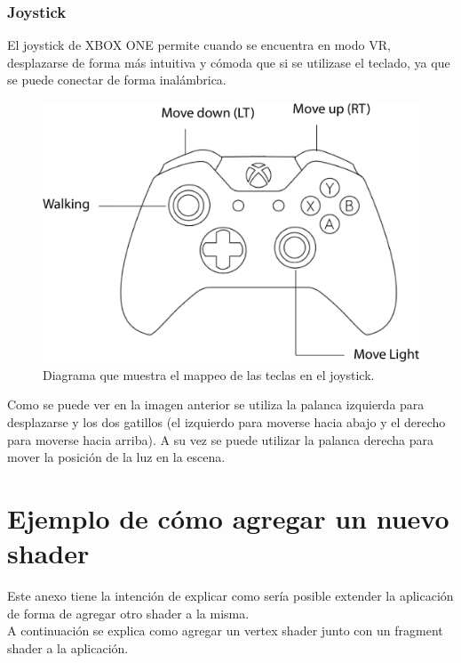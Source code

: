 \documentclass[12pt]{article}
\begin{document}
\subsubsection{Joystick}
El joystick de XBOX ONE permite cuando se encuentra en modo VR, desplazarse de forma más intuitiva y cómoda que si se utilizase el teclado, ya que se puede conectar de forma inalámbrica.\\
\clearpage
\begin{figure}[h]
\includegraphics[width=0.8\linewidth]{joystick.png}
\caption{Diagrama que muestra el mappeo de las teclas en el joystick.}
\end{figure}
Como se puede ver en la imagen anterior se utiliza la palanca izquierda para desplazarse y los dos gatillos (el izquierdo para moverse hacia abajo y el derecho para moverse hacia arriba). A su vez se puede utilizar la palanca derecha para mover la posición de la luz en la escena.
\clearpage
\section{Ejemplo de cómo agregar un nuevo shader}
Este anexo tiene la intención de explicar como sería posible extender la aplicación de forma de agregar otro shader a la misma.
\\A continuación se explica como agregar un vertex shader junto con un fragment shader a la aplicación.
\end{document}
